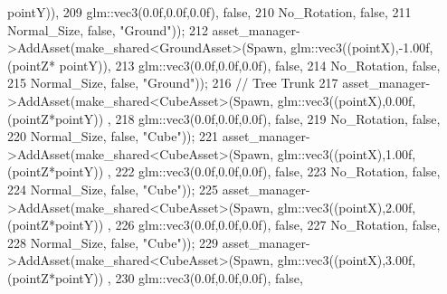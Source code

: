 \begin{DoxyCode}
      pointY)),
209                                                              glm::vec3(0.0f,0.0f,0.0f), \textcolor{keyword}{false},
210                                                              No\_Rotation, \textcolor{keyword}{false},
211                                                              Normal\_Size, \textcolor{keyword}{false}, \textcolor{stringliteral}{"Ground"}));
212             asset\_manager->AddAsset(make\_shared<GroundAsset>(Spawn, glm::vec3((pointX),-1.00f,(pointZ*
      pointY)),
213                                                              glm::vec3(0.0f,0.0f,0.0f), \textcolor{keyword}{false},
214                                                              No\_Rotation, \textcolor{keyword}{false},
215                                                              Normal\_Size, \textcolor{keyword}{false}, \textcolor{stringliteral}{"Ground"}));
216             \textcolor{comment}{// Tree Trunk}
217             asset\_manager->AddAsset(make\_shared<CubeAsset>(Spawn, glm::vec3((pointX),0.00f,(pointZ*pointY))
      , 
218                                                            glm::vec3(0.0f,0.0f,0.0f), \textcolor{keyword}{false},
219                                                            No\_Rotation, \textcolor{keyword}{false},
220                                                            Normal\_Size, \textcolor{keyword}{false}, \textcolor{stringliteral}{"Cube"}));
221             asset\_manager->AddAsset(make\_shared<CubeAsset>(Spawn, glm::vec3((pointX),1.00f,(pointZ*pointY))
      , 
222                                                            glm::vec3(0.0f,0.0f,0.0f), \textcolor{keyword}{false},
223                                                            No\_Rotation, \textcolor{keyword}{false},
224                                                            Normal\_Size, \textcolor{keyword}{false}, \textcolor{stringliteral}{"Cube"}));        
225             asset\_manager->AddAsset(make\_shared<CubeAsset>(Spawn, glm::vec3((pointX),2.00f,(pointZ*pointY))
      , 
226                                                            glm::vec3(0.0f,0.0f,0.0f), \textcolor{keyword}{false},
227                                                            No\_Rotation, \textcolor{keyword}{false},
228                                                            Normal\_Size, \textcolor{keyword}{false}, \textcolor{stringliteral}{"Cube"}));
229             asset\_manager->AddAsset(make\_shared<CubeAsset>(Spawn, glm::vec3((pointX),3.00f,(pointZ*pointY))
      , 
230                                                            glm::vec3(0.0f,0.0f,0.0f), \textcolor{keyword}{false},

\end{DoxyCode}
